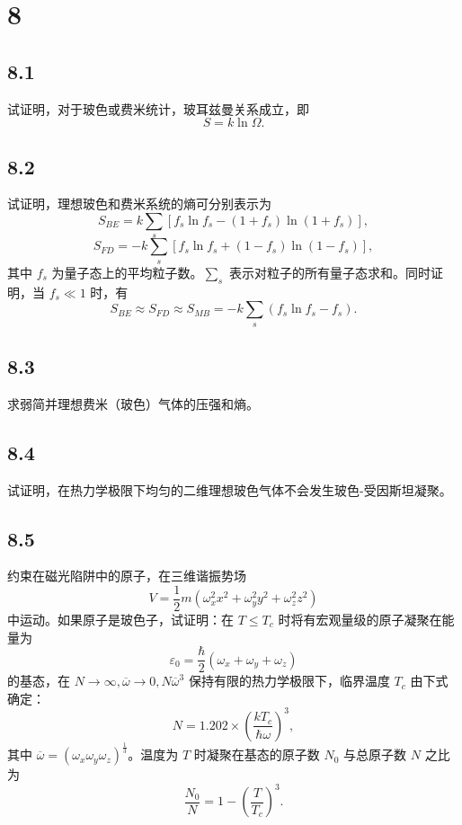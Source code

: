 \section{8}

\newpage
\subsection{8.1}
试证明，对于玻色或费米统计，玻耳兹曼关系成立，即
$$ S = k \ln \Omega. $$

\newpage
\subsection{8.2}
试证明，理想玻色和费米系统的熵可分别表示为
$$ S_{BE} = k \sum_s \left[ f_s \ln f_s - (1 + f_s) \ln (1 + f_s) \right], $$
$$ S_{FD} = -k \sum_s \left[ f_s \ln f_s + (1 - f_s) \ln (1 - f_s) \right], $$
其中 $f_s$ 为量子态上的平均粒子数。$\sum_s$ 表示对粒子的所有量子态求和。同时证明，当 $f_s \ll 1$ 时，有
$$ S_{BE} \approx S_{FD} \approx S_{MB} = -k \sum_s (f_s \ln f_s - f_s). $$

\newpage
\subsection{8.3}
求弱简并理想费米（玻色）气体的压强和熵。

\newpage
\subsection{8.4}
试证明，在热力学极限下均匀的二维理想玻色气体不会发生玻色-受因斯坦凝聚。

\newpage
\subsection{8.5}
约束在磁光陷阱中的原子，在三维谐振势场
$$ V = \frac{1}{2} m (\omega_x^2 x^2 + \omega_y^2 y^2 + \omega_z^2 z^2) $$
中运动。如果原子是玻色子，试证明：在 $T \leq T_c$ 时将有宏观量级的原子凝聚在能量为
$$ \varepsilon_0 = \frac{\hbar}{2} (\omega_x + \omega_y + \omega_z) $$
的基态，在 $N \to \infty, \overline{\omega} \to 0, N \overline{\omega}^3$ 保持有限的热力学极限下，临界温度 $T_c$ 由下式确定：
$$ N = 1.202 \times \left( \frac{kT_c}{\hbar \omega} \right)^3, $$
其中 $\overline{\omega} = (\omega_x \omega_y \omega_z )^{\frac{1}{3}}$。温度为 $T$ 时凝聚在基态的原子数 $N_0$ 与总原子数 $N$ 之比为
$$ \frac{N_0}{N} = 1 - \left( \frac{T}{T_c} \right)^3. $$

\newpage
